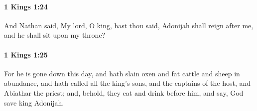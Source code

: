 		\paragraph{1 Kings 1:24} %
			\label{1KINGS-1-24}

			And Nathan said, My lord, O king, hast thou said, Adonijah shall reign after me, and he shall sit upon my throne?


		\paragraph{1 Kings 1:25} %
			\label{1KINGS-1-25}

			For he is gone down this day, and hath slain oxen and fat cattle and sheep in abundance, and hath called all the king’s sons, and the captains of the host, and Abiathar the priest; and, behold, they eat and drink before him, and say, God save king Adonijah.


